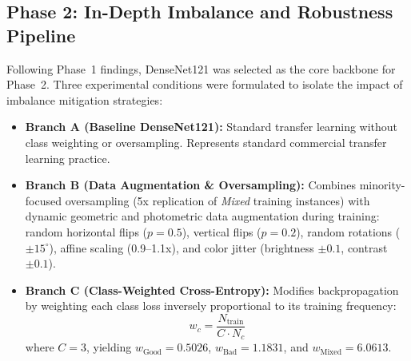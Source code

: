 \documentclass[conference]{IEEEtran}
\begin{document}
\subsection{Phase 2: In-Depth Imbalance and Robustness Pipeline}
Following Phase~1 findings, DenseNet121 was selected as the core backbone for Phase~2. Three experimental conditions were formulated to isolate the impact of imbalance mitigation strategies:
\begin{itemize}
    \item \textbf{Branch A (Baseline DenseNet121):} Standard transfer learning without class weighting or oversampling. Represents standard commercial transfer learning practice.
    \item \textbf{Branch B (Data Augmentation \& Oversampling):} Combines minority-focused oversampling (5x replication of \textit{Mixed} training instances) with dynamic geometric and photometric data augmentation during training: random horizontal flips ($p=0.5$), vertical flips ($p=0.2$), random rotations ($\pm 15^\circ$), affine scaling (0.9--1.1x), and color jitter (brightness $\pm 0.1$, contrast $\pm 0.1$).
    \item \textbf{Branch C (Class-Weighted Cross-Entropy):} Modifies backpropagation by weighting each class loss inversely proportional to its training frequency:
    \begin{equation}
        w_c = \frac{N_{\text{train}}}{C \cdot N_c}
    \end{equation}
    where $C=3$, yielding $w_{\text{Good}}=0.5026$, $w_{\text{Bad}}=1.1831$, and $w_{\text{Mixed}}=6.0613$.
\end{itemize}
\end{document}
